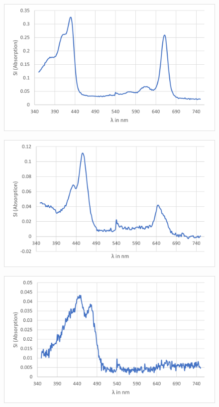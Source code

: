 \documentclass[10pt,a4paper]{article}
\begin{document}
			\begin{figure}[H]
				\centering
				\includegraphics[scale=1]{secondband.png}
				\caption{}
				\label{fig:zweite Bande}
			\end{figure}
			
			\begin{figure}[H]
				\centering
				\includegraphics[scale=1]{thirdband.png}
				\caption{}
				\label{fig:dritte Bande}
			\end{figure}
			
			\begin{figure}[H]
				\centering
				\includegraphics[scale=1]{fourthband.png}
				\caption{}
				\label{fig:vierte Bande}
			\end{figure}
			
\end{document}
